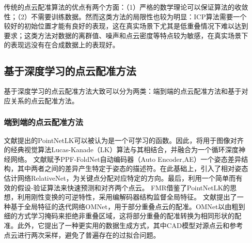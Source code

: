     传统的点云配准算法的优点有两个方面：（1）严格的数学理论可以保证算法的收敛性；（2）不需要训练数据。然而这类方法的局限性也较为明显：ICP算法需要一个较好的初始位置才能有良好的表现，这在真实场景下尤其是低重叠情况下难以达到要求；这类方法对数据的离群值、噪声和点云密度等特点较为敏感，在真实场景下的表现远没有在合成数据上的表现好。

    \subsection{基于深度学习的点云配准方法}
    基于深度学习的点云配准方法大致可以分为两类：端到端的点云配准方法和基于对应关系的点云配准方法。\par
    \subsubsection{端到端的点云配准方法}
    文献\cite{PointNetLK}提出的PointNetLK可以被认为是一个可学习的函数。因此，将用于图像对齐的经典视觉算法Lucas-Kanade（LK）算法与其相结合，并融合为一个循环深度神经网络。
    文献\cite{PPF}赋予PPF-FoldNet自动编码器（Auto Encoder,AE）一个姿态差异结构，其中两者之间的差异产生特定于姿态的描述符。在此基础上，引入了相对姿态估计网络RelativeNet，为关键点分配对应特定的方向。最后，利用一个简单而有效的假设-验证算法来快速预测和对齐两个点云。
    FMR借鉴了PointNetLK的思想，利用刚性变换的可逆特性，采用编解码器结构监督全局特征。
    文献\cite{OMNet}提出了一种基于全局特征的迭代网络OMNet，用于部分重叠点云的配准。OMNet以由粗到细的方式学习掩码来拒绝非重叠区域，这将部分重叠的配准转换为相同形状的配准。此外，它提出了一种更实用的数据生成方式，其中CAD模型对源点云和参考点云进行两次采样，避免了普遍存在的过拟合问题。
    \vspace{-0.1cm}
